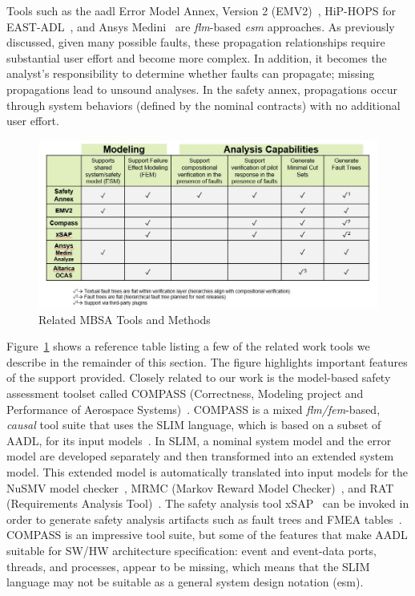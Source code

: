 Tools such as the \gls{aadl} Error Model Annex, Version 2 (EMV2)~\cite{EMV2}, HiP-HOPS for EAST-ADL~\cite{CHEN201391}, and Ansys Medini~\cite{ansys} are {\em \gls{flm}}-based {\em \gls{esm}} approaches.  As previously discussed, given many possible faults, these propagation relationships require substantial user effort and become more complex.  In addition, it becomes the analyst's responsibility to determine whether faults can propagate; missing propagations lead to unsound analyses.  In the safety annex, propagations occur through system behaviors (defined by the nominal contracts) with no additional user effort.

\begin{figure}[h!]
	\begin{centering}
		\includegraphics[width=\textwidth]{images/relatedwork.jpg}
		\caption{Related MBSA Tools and Methods}
		\label{fig:related}
	\end{centering}
\end{figure}

Figure~\ref{fig:related} shows a reference table listing a few of the related work tools we describe in the remainder of this section. The figure highlights important features of the support provided. Closely related to our work is the model-based safety assessment toolset called COMPASS (Correctness, Modeling project and Performance of Aerospace Systems)~\cite{10.1007/978-3-642-04468-7_15}.  COMPASS is a mixed {\em \gls{flm}/\gls{fem}}-based, {\em causal} tool suite that uses the SLIM language, which is based on a subset of AADL, for its input models~\cite{5185388, criticalembeddedsystems}. In SLIM, a nominal system model and the error model are developed separately and then transformed into an extended system model.  This extended model is automatically translated into input models for the NuSMV model checker~\cite{Cimatti2000, NuSMV}, MRMC (Markov Reward Model Checker)~\cite{Katoen:2005:MRM:1114692.1115230, MRMC}, and RAT (Requirements Analysis Tool)~\cite{RAT}. The safety analysis tool xSAP~\cite{DBLP:conf/tacas/BittnerBCCGGMMZ16} can be invoked in order to generate safety analysis artifacts such as fault trees and FMEA tables~\cite{compass30toolset}.  COMPASS is an impressive tool suite, but some of the features that make AADL suitable for SW/HW architecture specification: event and event-data ports, threads, and processes, appear to be missing, which means that the SLIM language may not be suitable as a general system design notation (\gls{esm}).

